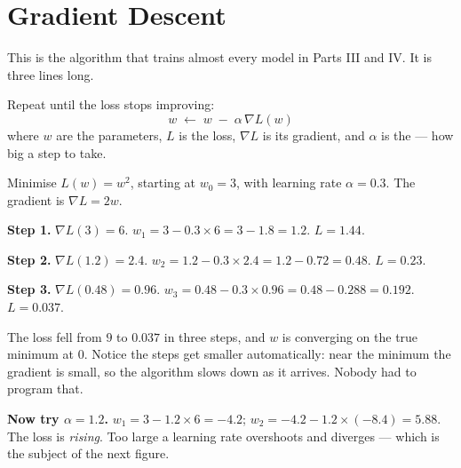 \section{Gradient Descent}

This is the algorithm that trains almost every model in Parts III and IV. It is
three lines long.

\begin{definitionbox}
Repeat until the loss stops improving:
\[
w \;\leftarrow\; w \;-\; \alpha \, \nabla L(w)
\]
where $w$ are the parameters, $L$ is the loss, $\nabla L$ is its gradient, and
$\alpha$ is the  --- how big a step to take.
\end{definitionbox}

\begin{worked}
Minimise $L(w) = w^2$, starting at $w_0 = 3$, with learning rate $\alpha = 0.3$.
The gradient is $\nabla L = 2w$.

\smallskip
\textbf{Step 1.} $\nabla L(3) = 6$. \quad
$w_1 = 3 - 0.3 \times 6 = 3 - 1.8 = 1.2$. \quad $L = 1.44$.

\textbf{Step 2.} $\nabla L(1.2) = 2.4$. \quad
$w_2 = 1.2 - 0.3 \times 2.4 = 1.2 - 0.72 = 0.48$. \quad $L = 0.23$.

\textbf{Step 3.} $\nabla L(0.48) = 0.96$. \quad
$w_3 = 0.48 - 0.3 \times 0.96 = 0.48 - 0.288 = 0.192$. \quad $L = 0.037$.

\smallskip
The loss fell from $9$ to $0.037$ in three steps, and $w$ is converging on the true
minimum at $0$. Notice the steps get smaller automatically: near the minimum the
gradient is small, so the algorithm slows down as it arrives. Nobody had to program
that.

\smallskip
\textbf{Now try $\alpha = 1.2$.} $w_1 = 3 - 1.2 \times 6 = -4.2$; $w_2 = -4.2 -
1.2\times(-8.4) = 5.88$. The loss is \emph{rising}. Too large a learning rate
overshoots and diverges --- which is the subject of the next figure.
\end{worked}


